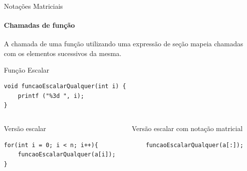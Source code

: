 \documentclass{beamer}
\begin{document}
\begin{frame}[fragile]{Notações Matriciais}
\framesubtitle{Chamadas de função}
   A chamada de uma função utilizando uma expressão de seção mapeia chamadas com os elementos sucessivos da mesma.

\begin{block}{Função Escalar}
\begin{lstlisting}
void funcaoEscalarQualquer(int i) {
    printf ("%3d ", i);
}
\end{lstlisting}
\end{block}
\pause
\begin{scriptsize}
\begin{columns}
\begin{column}{0.4\textwidth}
\begin{block}{Versão escalar} 
\begin{lstlisting}
for(int i = 0; i < n; i++){
    funcaoEscalarQualquer(a[i]);
}
\end{lstlisting}
\end{block}
\pause
\end{column}
\begin{column}{0.55\textwidth}
\begin{block}{Versão escalar com notação matricial} 
\begin{lstlisting}
    funcaoEscalarQualquer(a[:]);
\end{lstlisting}
\end{block}
\end{column}

\end{columns}
\end{scriptsize}
\end{frame}
\end{document}
